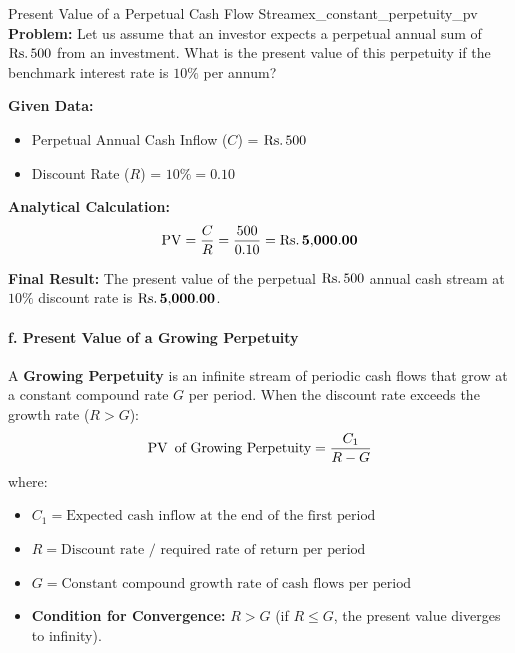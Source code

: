 \begin{example}{Present Value of a Perpetual Cash Flow Stream}{ex_constant_perpetuity_pv}
\textbf{Problem:}
Let us assume that an investor expects a perpetual annual sum of $\text{Rs.}\, 500$ from an investment. What is the present value of this perpetuity if the benchmark interest rate is $10\%$ per annum?

\tcbline
\textbf{Given Data:}
\begin{itemize}[noitemsep]
    \item Perpetual Annual Cash Inflow ($C$) = $\text{Rs.}\, 500$
    \item Discount Rate ($R$) = $10\% = 0.10$
\end{itemize}

\textbf{Analytical Calculation:}
\begin{equation*}
    \operatorname{PV} = \frac{C}{R} = \frac{500}{0.10} = \mathbf{\text{Rs.}\, 5{,}000.00}
\end{equation*}

\textbf{Final Result:}
The present value of the perpetual $\text{Rs.}\, 500$ annual cash stream at $10\%$ discount rate is $\mathbf{\text{Rs.}\, 5{,}000.00}$.
\end{example}

\begin{formulabox}
\paragraph{f. Present Value of a Growing Perpetuity}
A \textbf{Growing Perpetuity} is an infinite stream of periodic cash flows that grow at a constant compound rate $G$ per period. When the discount rate exceeds the growth rate ($R > G$):
\begin{equation}
    \operatorname{PV} \text{ of Growing Perpetuity} = \frac{C_1}{R - G}
\end{equation}
where:
\begin{itemize}[noitemsep]
    \item $C_1 = \text{Expected cash inflow at the end of the first period}$
    \item $R = \text{Discount rate / required rate of return per period}$
    \item $G = \text{Constant compound growth rate of cash flows per period}$
    \item \textbf{Condition for Convergence:} $R > G$ (if $R \le G$, the present value diverges to infinity).
\end{itemize}
\end{formulabox}

